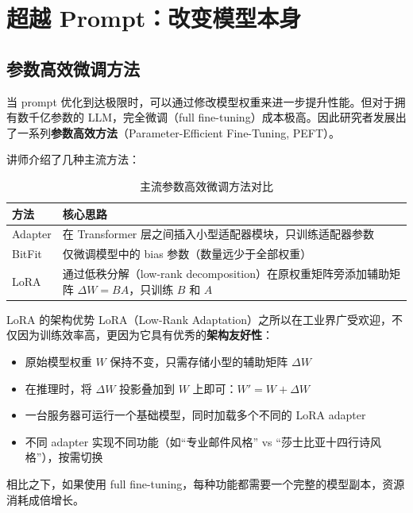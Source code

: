 \section{超越 Prompt：改变模型本身}

\subsection{参数高效微调方法}

当 prompt 优化到达极限时，可以通过修改模型权重来进一步提升性能。但对于拥有数千亿参数的 LLM，完全微调（full fine-tuning）成本极高。因此研究者发展出了一系列\textbf{参数高效方法}（Parameter-Efficient Fine-Tuning, PEFT）。

讲师介绍了几种主流方法：

\begin{table}[H]
\centering
\begin{tabular}{lp{8cm}}
\toprule
\textbf{方法} & \textbf{核心思路} \\
\midrule
Adapter & 在 Transformer 层之间插入小型适配器模块，只训练适配器参数 \\
BitFit  & 仅微调模型中的 bias 参数（数量远少于全部权重） \\
LoRA    & 通过低秩分解（low-rank decomposition）在原权重矩阵旁添加辅助矩阵 $\Delta W = BA$，只训练 $B$ 和 $A$ \\
\bottomrule
\end{tabular}
\caption{主流参数高效微调方法对比}
\end{table}

\begin{importantbox}{LoRA 的架构优势}
LoRA（Low-Rank Adaptation）之所以在工业界广受欢迎，不仅因为训练效率高，更因为它具有优秀的\textbf{架构友好性}：

\begin{itemize}
    \item 原始模型权重 $W$ 保持不变，只需存储小型的辅助矩阵 $\Delta W$
    \item 在推理时，将 $\Delta W$ 投影叠加到 $W$ 上即可：$W' = W + \Delta W$
    \item 一台服务器可运行一个基础模型，同时加载多个不同的 LoRA adapter
    \item 不同 adapter 实现不同功能（如``专业邮件风格'' vs ``莎士比亚十四行诗风格''），按需切换
\end{itemize}

相比之下，如果使用 full fine-tuning，每种功能都需要一个完整的模型副本，资源消耗成倍增长。
\end{importantbox}

